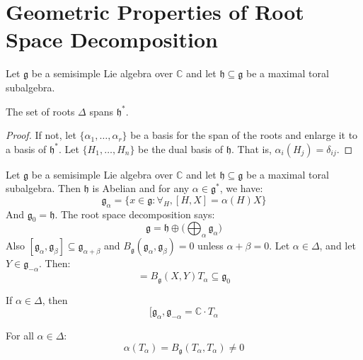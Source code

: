\section{Geometric Properties of Root Space Decomposition}
    Let $\mathfrak{g}$ be a semisimple Lie algebra over $\mathbb{C}$ and let
    $\mathfrak{h}\subseteq\mathfrak{g}$ be a maximal toral subalgebra.
    \begin{theorem}
        The set of roots $\Delta$ spans $\mathfrak{h}^{*}$.
    \end{theorem}
    \begin{proof}
        If not, let $\{\alpha_{1},\dots,\alpha_{r}\}$ be a basis for the
        span of the roots and enlarge it to a basis of $\mathfrak{h}^{*}$.
        Let $\{H_{1},\dots,H_{n}\}$ be the dual basis of $\mathfrak{h}$.
        That is, $\alpha_{i}(H_{j})=\delta_{ij}$. 
    \end{proof}
    Let $\mathfrak{g}$ be a semisimple Lie algebra over $\mathbb{C}$ and let
    $\mathfrak{h}\subseteq\mathfrak{g}$ be a maximal toral subalgebra. Then
    $\mathfrak{h}$ is Abelian and for any $\alpha\in\mathfrak{g}^{*}$, we
    have:
    \begin{equation}
        \mathfrak{g}_{\alpha}=
        \{x\in\mathfrak{g}:\forall_{H},[H,X]=\alpha(H)X\}
    \end{equation}
    And $\mathfrak{g}_{0}=\mathfrak{h}$. The root space decomposition says:
    \begin{equation}
        \mathfrak{g}=
        \mathfrak{h}\oplus\Big(\bigoplus_{\alpha}\mathfrak{g}_{\alpha}\Big)
    \end{equation}
    Also $[\mathfrak{g}_{\alpha},\mathfrak{g}_{\beta}]%
          \subseteq\mathfrak{g}_{\alpha+\beta}$ and
    $B_{\mathfrak{g}}(\mathfrak{g}_{\alpha},\mathfrak{g}_{\beta})=0$ unless
    $\alpha+\beta=0$. Let $\alpha\in\Delta$, and let
    $Y\in\mathfrak{g}_{\minus\alpha}$. Then:
    \begin{equation}
        [X,Y]=B_{\mathfrak{g}}(X,Y)T_{\alpha}\subseteq\mathfrak{g}_{0}
    \end{equation}
    \begin{theorem}
        If $\alpha\in\Delta$, then
        \begin{equation}
            [\mathfrak{g}_{\alpha},\mathfrak{g}_{\minus\alpha}
            =\mathbb{C}\cdot{T}_{\alpha}
        \end{equation}
    \end{theorem}
    \begin{theorem}
        For all $\alpha\in\Delta$:
        \begin{equation}
            \alpha(T_{\alpha})
            =B_{\mathfrak{g}}(T_{\alpha},T_{\alpha})\ne{0}
        \end{equation}
    \end{theorem}
